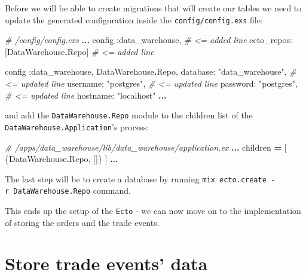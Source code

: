 \documentclass[
  oneside]{book}
\newenvironment{Shaded}{\begin{snugshade}}{\end{snugshade}}
\newcommand{\CommentTok}[1]{\textcolor[rgb]{0.56,0.35,0.01}{\textit{#1}}}
\newcommand{\ConstantTok}[1]{\textcolor[rgb]{0.00,0.00,0.00}{#1}}
\newcommand{\NormalTok}[1]{#1}
\newcommand{\OperatorTok}[1]{\textcolor[rgb]{0.81,0.36,0.00}{\textbf{#1}}}
\newcommand{\StringTok}[1]{\textcolor[rgb]{0.31,0.60,0.02}{#1}}
\newcommand{\VariableTok}[1]{\textcolor[rgb]{0.00,0.00,0.00}{#1}}
\begin{document}
Before we will be able to create migrations that will create our tables we need to update the generated configuration inside the \texttt{config/config.exs} file:

\begin{Shaded}
\begin{Highlighting}[]
\CommentTok{\# /config/config.exs}
\OperatorTok{...}
\NormalTok{config }\VariableTok{:data\_warehouse}\NormalTok{,            }\CommentTok{\# \textless{}= added line}
  \VariableTok{ecto\_repos:}\NormalTok{ [}\ConstantTok{DataWarehouse}\OperatorTok{.}\ConstantTok{Repo}\NormalTok{] }\CommentTok{\# \textless{}= added line}

\NormalTok{config }\VariableTok{:data\_warehouse}\NormalTok{, }\ConstantTok{DataWarehouse}\OperatorTok{.}\ConstantTok{Repo}\NormalTok{,}
  \VariableTok{database:} \StringTok{"data\_warehouse"}\NormalTok{, }\CommentTok{\# \textless{}= updated line}
  \VariableTok{username:} \StringTok{"postgres"}\NormalTok{,       }\CommentTok{\# \textless{}= updated line}
  \VariableTok{password:} \StringTok{"postgres"}\NormalTok{,       }\CommentTok{\# \textless{}= updated line}
  \VariableTok{hostname:} \StringTok{"localhost"}
\OperatorTok{...}
\end{Highlighting}
\end{Shaded}

and add the \texttt{DataWarehouse.Repo} module to the children list of the \texttt{DataWarehouse.Application}'s process:

\begin{Shaded}
\begin{Highlighting}[]
    \CommentTok{\# /apps/data\_warehouse/lib/data\_warehouse/application.ex}
    \OperatorTok{...}
\NormalTok{    children }\OperatorTok{=}\NormalTok{ [}
\NormalTok{      \{}\ConstantTok{DataWarehouse}\OperatorTok{.}\ConstantTok{Repo}\NormalTok{, []\}}
\NormalTok{    ]}
    \OperatorTok{...}
\end{Highlighting}
\end{Shaded}

The last step will be to create a database by running \texttt{mix\ ecto.create\ -r\ DataWarehouse.Repo} command.

This ends up the setup of the \texttt{Ecto} - we can now move on to the implementation of storing the orders and the trade events.

\hypertarget{store-trade-events-data}{%
\section{Store trade events' data}\label{store-trade-events-data}}
\end{document}
